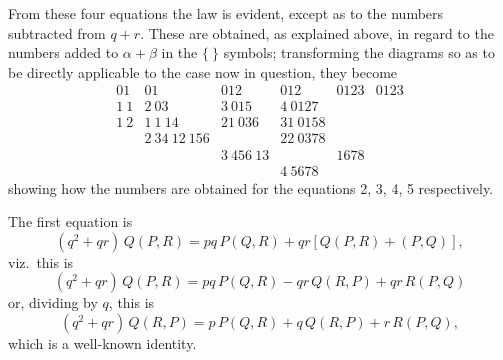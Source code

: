 \documentclass[11pt,a4paper]{article}
\begin{document}
\newpage


From these four equations the law is evident, except as to the numbers subtracted from $q+r$. These are obtained, as explained above, in regard to the numbers added to $\alpha + \beta$ in the $\{\ \}$ symbols; transforming the diagrams so as to be directly applicable to the case now in question, they become
\[
\begin{array}{cccccc}
01 & 01 & 012 & 012 & 0123 & 0123\\
1\ 1 & 2\ 03 & 3\ 015 & 4\ 0127\\
1\ 2 & 1\ 1\ 14 & 21\ 036 & 31\ 0158\\
& 2\ 34\ 12\ 156 & & 22\ 0378\\
& & 3\ 456\ 13 & & 1678\\
& & & 4\ 5678 &
\end{array}
\]
showing how the numbers are obtained for the equations 2, 3, 4, 5 respectively.

The first equation is
\[
(q^{2} + qr)\,Q(P, R) = pq\,P(Q, R) + qr[Q(P, R) + (P, Q)],
\]
viz.\ this is
\[
(q^{2} + qr)\,Q(P, R) = pq\,P(Q, R) - qr\,Q(R, P) + qr\,R(P, Q)
\]
or, dividing by $q$, this is
\[
(q^{2} + qr)\,Q(R, P) = p\,P(Q, R) + q\,Q(R, P) + r\,R(P, Q),
\]
which is a well-known identity.

\medskip
\end{document}
